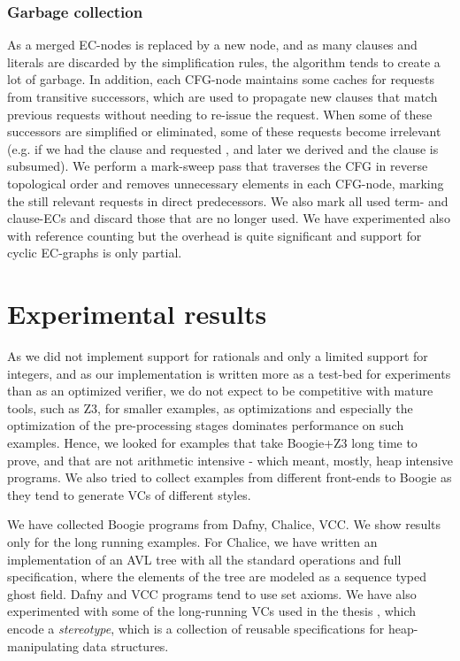 \subsubsection*{Garbage collection}
As a merged EC-nodes is replaced by a new node, and as many clauses and literals are discarded by the simplification rules, the algorithm tends to create a lot of garbage. In addition, each CFG-node maintains some caches for requests from transitive successors, which are used to propagate new clauses that match previous requests without needing to re-issue the request.
When some of these successors are simplified or eliminated, some of these requests become irrelevant (e.g. if we had the clause  and requested , and later we derived  and the clause is subsumed). We perform a mark-sweep pass that traverses the CFG in reverse topological order and removes unnecessary elements in each CFG-node, marking the still relevant requests in direct predecessors. We also mark all used term- and clause-ECs and discard those that are no longer used. 
We have experimented also with reference counting but the overhead is quite significant and support for cyclic EC-graphs is only partial.


\section{Experimental results}



As we did not implement support for rationals and only a limited support for integers, and as our implementation is written more as a test-bed for experiments than as an optimized verifier, we do not expect to be competitive with mature tools, such as Z3, for smaller examples, as optimizations and especially the optimization of the pre-processing stages dominates performance on such examples. 
Hence, we looked for examples that take Boogie+Z3 long time to prove, and that are not arithmetic intensive - which meant, mostly, heap intensive programs. 
We also tried to collect examples from different front-ends to Boogie as they tend to generate VCs of different styles. 

We have collected Boogie programs from Dafny, Chalice, VCC. We show results only for the long running examples.
For Chalice, we have written an implementation of an AVL tree with all the standard operations and full specification, 
where the elements of the tree are modeled as a sequence typed ghost field. Dafny and VCC programs tend to use set axioms.
We have also experimented with some of the long-running VCs used in the thesis \cite{Rdch2011}, 
which encode a \emph{stereotype}, which is a collection of reusable specifications for heap-manipulating data structures.

